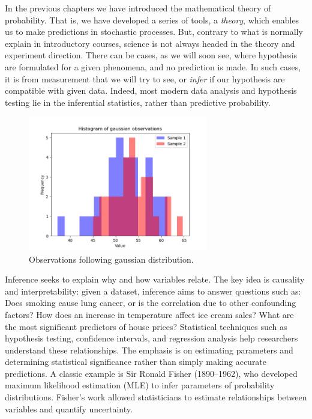 \documentclass{book}
\begin{document}
In the previous chapters we have introduced the mathematical theory of probability. That is, we have developed a series of tools, a \textit{theory}, which enables us to make predictions in stochastic processes. But, contrary to what is normally explain in introductory courses, science is not always headed in the theory and experiment direction. There can be cases, as we will soon see, where hypothesis are formulated for a given phenomena, and no prediction is made. In such cases, it is from measurement that we will try to see, or \textit{infer} if our hypothesis are compatible with given data. Indeed, most modern data analysis and hypothesis testing lie in the inferential statistics, rather than predictive probability.

\begin{figure}[ht]
    \centering
    \includegraphics[width=0.7\textwidth]{figures/chapter4/t_2_samples_observations.png}
    \caption{Observations following gaussian distribution.}
    \label{fig:t_2_sample_obs}
\end{figure}

Inference seeks to explain why and how variables relate. The key idea is causality and interpretability: given a dataset, inference aims to answer questions such as: Does smoking cause lung cancer, or is the correlation due to other confounding factors? How does an increase in temperature affect ice cream sales? What are the most significant predictors of house prices? Statistical techniques such as hypothesis testing, confidence intervals, and regression analysis help researchers understand these relationships. The emphasis is on estimating parameters and determining statistical significance rather than simply making accurate predictions. A classic example is Sir Ronald Fisher (1890–1962), who developed maximum likelihood estimation (MLE) to infer parameters of probability distributions. Fisher’s work allowed statisticians to estimate relationships between variables and quantify uncertainty.\\
\end{document}
